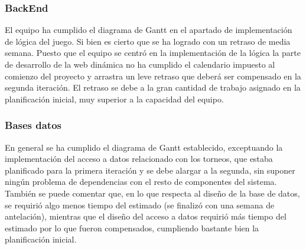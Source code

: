 \subsubsection*{BackEnd}
El equipo ha cumplido el diagrama de Gantt en el apartado de implementación de lógica del juego. Si bien es cierto que se ha logrado con un retraso de media semana. Puesto que el equipo se centró en la implementación de la lógica la parte de desarrollo de la web dinámica no ha cumplido el calendario impuesto al comienzo del proyecto y arrastra un leve retraso que deberá ser compensado en la segunda iteración. El retraso se debe a la gran cantidad de trabajo asignado en la planificación inicial, muy superior a la capacidad del equipo.

\subsubsection*{Bases datos}
En general se ha cumplido el diagrama de Gantt establecido, exceptuando la implementación del acceso a datos relacionado con los torneos, que estaba planificado para la primera iteración y se debe alargar a la segunda, sin suponer ningún problema de dependencias con el resto de componentes del sistema. También se puede comentar que, en lo que respecta al diseño de la base de datos, se requirió algo menos tiempo del estimado (se finalizó con una semana de antelación), mientras que el diseño del acceso a datos requirió más tiempo del estimado por lo que fueron compensados, cumpliendo bastante bien la planificación inicial.
